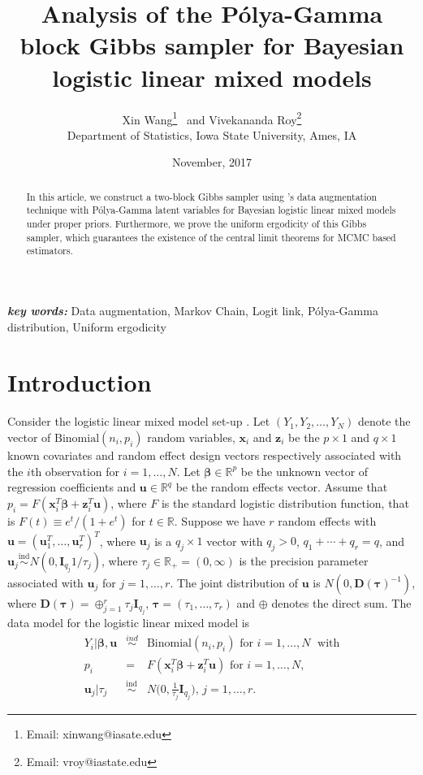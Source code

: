 \documentclass[11pt,a4paper]{article}
\title{Analysis of the P\'olya-Gamma block Gibbs sampler for Bayesian logistic linear mixed models}
\date{November, 2017}
\author{ Xin Wang\thanks{Email: xinwang@iasate.edu}  \, and Vivekananda Roy\thanks{Email: vroy@iastate.edu} \\
	Department of Statistics, Iowa State University, Ames, IA}
\providecommand{\keywords}[1]{\textbf{\textit{key words: }} #1}
\newcommand{\pcite}[1]{\citeauthor{#1}'s \citeyearpar{#1}}
\begin{document}
\maketitle


\begin{abstract}
In this article,  we construct a two-block Gibbs sampler using \pcite{polson2013bayesian} data augmentation technique with P\'olya-Gamma latent variables for Bayesian logistic linear mixed models under proper priors. Furthermore, we prove the uniform ergodicity of this Gibbs sampler, which guarantees the existence of the central limit theorems for MCMC based estimators. 
\end{abstract}
\keywords{Data augmentation, Markov Chain, Logit link, P\'olya-Gamma distribution, Uniform ergodicity}


\section{Introduction}
\label{sec_intro}
Consider the logistic linear mixed model set-up \citep{McCullochCharlesE2008Glam, mcculloch2003generalized}.  Let  $(Y_1, Y_2, \dots, Y_N)$ denote the vector of $\text{Binomial}(n_i,p_i)$ random variables,  $\bm{x}_i$ and $\bm{z}_i$ be the $p \times 1$ and $q \times 1$ known covariates and random effect design vectors respectively associated with the $i$th observation for $i=1,\dots,N$. Let $\bm{\beta} \in \mathbb{R}^p$ be the unknown vector of regression coefficients and $\bm{u} \in \mathbb{R}^q$ be the random effects vector. Assume that $p_i = F(\bm{x}_i^T\bm{\beta} + \bm{z}_i^T\bm{u})$, where $F$ is the standard logistic distribution function, that is $F(t) \equiv e^t/(1+e^t)$ for $t\in \mathbb{R}$. Suppose we have $r$ random effects with $\bm{u} = (\bm{u}_1^T,\dots, \bm{u}_r^T)^T$, where $\bm{u}_j$ is a $q_j\times1$ vector with $q_j >0$, $q_1+\cdots + q_r = q$, and $\bm{u}_j \stackrel{\text{ind}}{\sim} N(0, \bm{I}_{q_j}1/\tau_j)$, where $\tau_j\in \mathbb{R}_+ = (0,\infty)$ is the precision parameter associated with $\bm{u}_j$ for $j=1,\dots,r$. The joint distribution of $\bm{u}$ is $N\left(0,\bm{D}(\bm{\tau})^{-1}\right)$, where $\bm{D}(\bm{\tau})=\oplus_{j=1}^{r}\tau_{j}\bm{I}_{q_{j}}$, $\bm{\tau}= (\tau_1, \dots, \tau_r)$ and $\oplus$ denotes the direct sum. The data model for the logistic linear mixed model is
\begin{eqnarray}
\label{eq:data}
Y_{i} | \bm{\beta}, \bm{u} & \overset{ind}\sim & \text{Binomial}(n_i, p_{i}) \text{ for } i=1,\dots,N \;\text{ with} \nonumber\\
p_{i} & = & F(\bm{x}_{i}^{T}\bm{\beta}+\bm{z}_{i}^{T}\bm{u}) \text{ for }i=1,\dots,N, \\
\bm{u}_{j}| \tau_j & \overset{\text{ind}}\sim & N\Big(0,\frac{1}{\tau_{j}}\bm{I}_{q_{j}}\Big) , \, j=1,\dots,r .\nonumber
\end{eqnarray}
\end{document}
